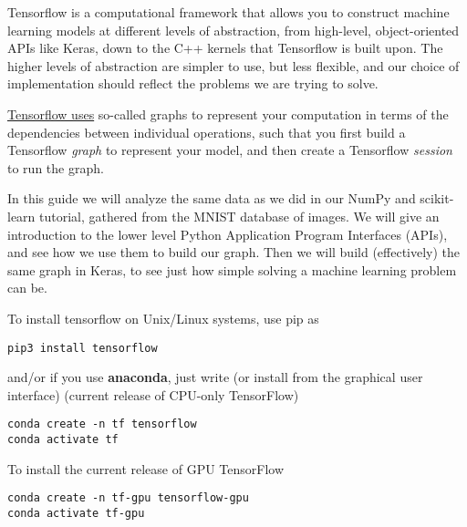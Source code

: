 Tensorflow is a computational framework that allows you to construct
machine learning models at different levels of abstraction, from
high-level, object-oriented APIs like Keras, down to the C++ kernels
that Tensorflow is built upon. The higher levels of abstraction are
simpler to use, but less flexible, and our choice of implementation
should reflect the problems we are trying to solve.

\href{{https://www.tensorflow.org/guide/graphs}}{Tensorflow uses} so-called graphs to represent your computation
in terms of the dependencies between individual operations, such that you first build a Tensorflow \emph{graph}
to represent your model, and then create a Tensorflow \emph{session} to run the graph.

In this guide we will analyze the same data as we did in our NumPy and
scikit-learn tutorial, gathered from the MNIST database of images. We
will give an introduction to the lower level Python Application
Program Interfaces (APIs), and see how we use them to build our graph.
Then we will build (effectively) the same graph in Keras, to see just
how simple solving a machine learning problem can be.

To install tensorflow on Unix/Linux systems, use pip as


\begin{verbatim}
pip3 install tensorflow

\end{verbatim}

and/or if you use \textbf{anaconda}, just write (or install from the graphical user interface)
(current release of CPU-only TensorFlow)



\begin{verbatim}
conda create -n tf tensorflow
conda activate tf

\end{verbatim}

To install the current release of GPU TensorFlow



\begin{verbatim}
conda create -n tf-gpu tensorflow-gpu
conda activate tf-gpu

\end{verbatim}



